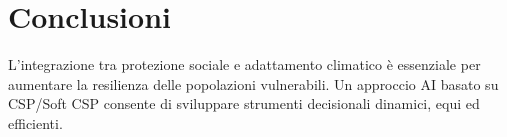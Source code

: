 \documentclass[11pt]{article}
\begin{document}
\section{Conclusioni}
L'integrazione tra protezione sociale e adattamento climatico è essenziale per aumentare la resilienza delle popolazioni vulnerabili. 
Un approccio AI basato su CSP/Soft CSP consente di sviluppare strumenti decisionali dinamici, equi ed efficienti.


\end{document}
